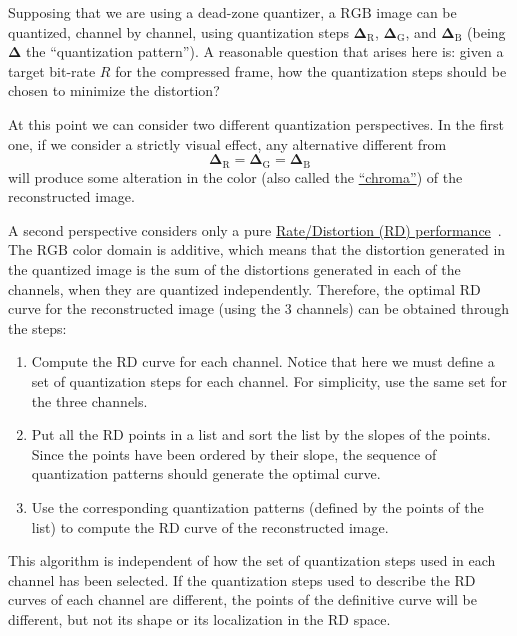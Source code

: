 Supposing that we are using a dead-zone quantizer, a $\text{RGB}$
image can be quantized, channel by channel, using quantization steps
$\mathbf{\Delta}_{\text{R}}$, $\mathbf{\Delta}_{\text{G}}$, and
$\mathbf{\Delta}_{\text{B}}$ (being $\mathbf{\Delta}$ the
``quantization pattern''). A reasonable question that arises here is:
given a target bit-rate $R$ for the compressed frame, how the
quantization steps should be chosen to minimize the distortion?

At this point we can consider two different quantization
perspectives. In the first one, if we consider a strictly visual
effect, any alternative different from
\begin{equation}
  \mathbf{\Delta}_{\text{R}} = \mathbf{\Delta}_{\text{G}} = \mathbf{\Delta}_{\text{B}}
  \label{eq:simple_Q}
\end{equation}
will produce some alteration in the color (also called the
\href{https://en.wikipedia.org/wiki/Chrominance}{``chroma''}) of the
reconstructed image.

A second perspective considers only a pure
\href{https://en.wikipedia.org/wiki/Rate-distortion_theory}{Rate/Distortion
  (RD) performance}~\cite{vruiz__information_theory}. The $\text{RGB}$
color domain is additive, which means that the distortion generated in
the quantized image is the sum of the distortions generated in each of
the channels, when they are quantized independently. Therefore, the
optimal RD curve for the reconstructed image (using the $3$ channels)
can be obtained through the steps:
\begin{enumerate}
\item Compute the RD curve for each channel. Notice that here we must
  define a set of quantization steps for each channel. For simplicity,
  use the same set for the three channels.
\item Put all the RD points in a list and sort the list by the slopes
  of the points. Since the points have been ordered by their slope,
  the sequence of quantization patterns should generate the optimal
  curve.
\item Use the corresponding quantization patterns (defined by the points
  of the list) to compute the RD curve of the reconstructed image.
\end{enumerate}

This algorithm is independent of how the set of quantization steps
used in each channel has been selected. If the quantization steps used
to describe the RD curves of each channel are different, the points of
the definitive curve will be different, but not its shape or its
localization in the RD space.

